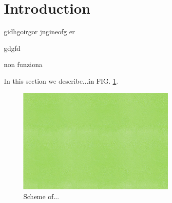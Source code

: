 \documentclass[rmp,10pt,onecolumn,fleqn,notitlepage]{revtex4-1}
\begin{document}

{
  \hypersetup{linkcolor=black}
  \tableofcontents
}
\noindent\makebox[\linewidth]{\color{linescolor} \rule[-0.2cm]{0.85\paperwidth}{1pt}}
\noindent\makebox[\linewidth]{\color{linescolor} \rule[0.3cm]{0.85\paperwidth}{1.2 pt}}
\pagebreak


\newpage
{}






\section{Introduction}
\label{sec:introduction}

gidhgoirgor
jngineofg er

gdgfd

non funziona

In this section we describe...in FIG. \ref{fig:1_prova}.

	\begin{figure}[h!]
	    \centering
	    \includegraphics[width=0.7\textwidth]{image/prova.jpg}
	    \caption{Scheme of...}
	    \label{fig:1_prova}
	\end{figure}
\end{document}
